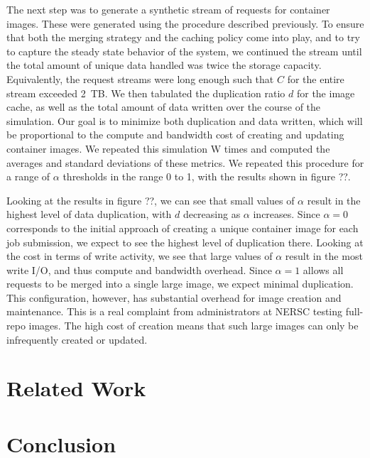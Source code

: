 \documentclass[sigconf]{acmart}
\begin{document}
The next step was to generate a synthetic stream of requests for container images.
These were generated using the procedure described previously.
To ensure that both the merging strategy and the caching policy come into play,
and to try to capture the steady state behavior of the system,
we continued the stream until the total amount of unique data handled was twice the storage capacity.
Equivalently, the request streams were long enough such that $C$ for the entire stream exceeded 2~TB.
We then tabulated the duplication ratio $d$ for the image cache,
as well as the total amount of data written over the course of the simulation.
Our goal is to minimize both duplication and data written,
which will be proportional to the compute and bandwidth cost of creating and updating container images.
We repeated this simulation W times and computed the averages and standard deviations of these metrics.
We repeated this procedure for a range of $\alpha$ thresholds in the range 0 to 1,
with the results shown in figure ??.

Looking at the results in figure ??,
we can see that small values of $\alpha$ result in the highest level of data duplication,
with $d$ decreasing as $\alpha$ increases.
Since $\alpha=0$ corresponds to the initial approach of creating a unique container image for each job submission,
we expect to see the highest level of duplication there.
Looking at the cost in terms of write activity,
we see that large values of $\alpha$ result in the most write I/O,
and thus compute and bandwidth overhead.
Since $\alpha=1$ allows all requests to be merged into a single large image,
we expect minimal duplication.
This configuration, however,
has substantial overhead for image creation and maintenance.
This is a real complaint from administrators at NERSC testing full-repo images.
The high cost of creation means that such large images can only be infrequently created or updated.


\section{Related Work}

\section{Conclusion}
\end{document}
